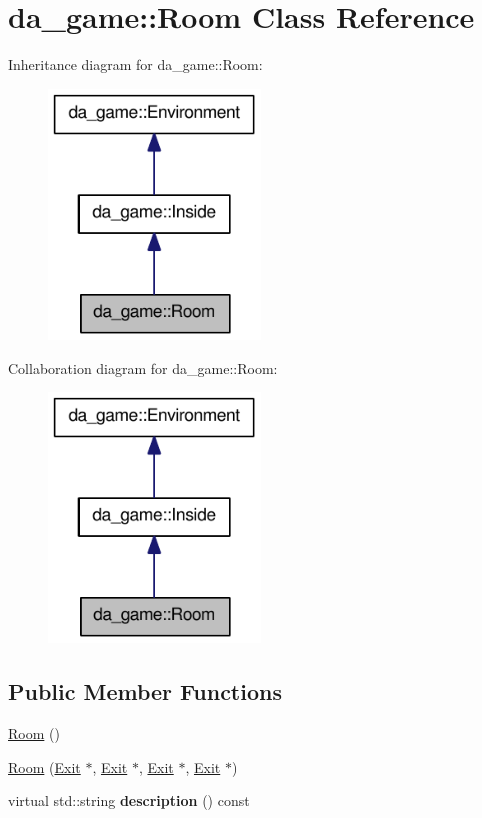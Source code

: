 \hypertarget{classda__game_1_1Room}{
\section{da\_\-game::Room Class Reference}
\label{classda__game_1_1Room}
}
Inheritance diagram for da\_\-game::Room:\nopagebreak
\begin{figure}[H]
\begin{center}
\leavevmode
\includegraphics[width=160pt]{classda__game_1_1Room__inherit__graph}
\end{center}
\end{figure}
Collaboration diagram for da\_\-game::Room:\nopagebreak
\begin{figure}[H]
\begin{center}
\leavevmode
\includegraphics[width=160pt]{classda__game_1_1Room__coll__graph}
\end{center}
\end{figure}
\subsection*{Public Member Functions}
\begin{DoxyCompactItemize}
\item 
\hyperlink{classda__game_1_1Room_aa36091a4e06c697468cd4e48da7d94c1}{Room} ()
\item 
\hyperlink{classda__game_1_1Room_ac8abf8b2bb0499d4008859ba8a5bb3d3}{Room} (\hyperlink{classda__game_1_1Exit}{Exit} $\ast$, \hyperlink{classda__game_1_1Exit}{Exit} $\ast$, \hyperlink{classda__game_1_1Exit}{Exit} $\ast$, \hyperlink{classda__game_1_1Exit}{Exit} $\ast$)
\item 
\hypertarget{classda__game_1_1Room_a7fabe80fe90a22324aeda1aa3a315903}{
virtual std::string {\bfseries description} () const }
\label{classda__game_1_1Room_a7fabe80fe90a22324aeda1aa3a315903}

\end{DoxyCompactItemize}


